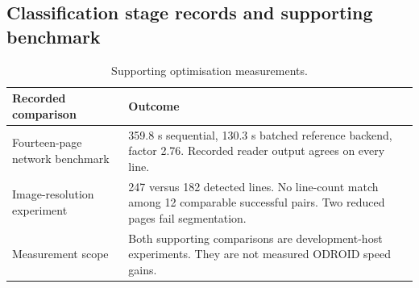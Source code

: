 \subsection{Classification stage records and supporting benchmark}\label{app:res-classification-time}

\begin{table}[H]\centering\small
\begin{tabular}{p{.35\linewidth}p{.57\linewidth}}
\toprule Recorded comparison & Outcome\\\midrule
Fourteen-page network benchmark & 359.8 s sequential, 130.3 s batched reference backend, factor 2.76. Recorded reader output agrees on every line.\\
Image-resolution experiment & 247 versus 182 detected lines. No line-count match among 12 comparable successful pairs. Two reduced pages fail segmentation.\\
Measurement scope & Both supporting comparisons are development-host experiments. They are not measured ODROID speed gains.\\
\bottomrule\end{tabular}
\caption{Supporting optimisation measurements.}\label{tab:app-acceleration}\end{table}

